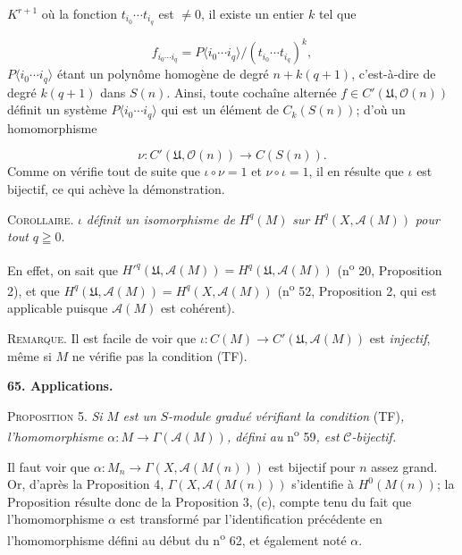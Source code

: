  $K^{r+1}$ où la fonction $t_{i_0} \cdots t_{i_q}$ est $\neq 0$, il existe un entier $k$ tel que

\begin{equation*}
f_{i_0 \cdots i_q} = P\langle i_0 \cdots i_q\rangle/(t_{i_0} \cdots t_{i_q})^k,
\end{equation*}
$P\langle i_0 \cdots i_q\rangle$ étant un polynôme homogène de degré $n + k(q + 1)$, c'est-à-dire de degré $k(q + 1)$ dans $S(n)$. Ainsi, toute cochaîne alternée $f \in C'(\mathfrak{U}, \mathcal{O}(n))$ définit un système $P\langle i_0 \cdots i_q\rangle$ qui est un élément de $C_k(S(n))$; d'où un homomorphisme

\begin{equation*}
\nu : C'(\mathfrak{U}, \mathcal{O}(n)) \to C(S(n)).
\end{equation*}
Comme on vérifie tout de suite que $\iota \circ \nu = 1$ et $\nu \circ \iota = 1$, il en résulte que $\iota$ est bijectif, ce qui achève la démonstration.

\textsc{Corollaire}. $\iota$ \textit{définit un isomorphisme de} $H^q(M)$ \textit{sur} $H^q(X, \mathcal{A}(M))$ \textit{pour tout} $q \geqq 0$.

En effet, on sait que $H'^q(\mathfrak{U}, \mathcal{A}(M)) = H^q(\mathfrak{U}, \mathcal{A}(M))$ (n\textsuperscript{o} 20, Proposition 2), et que $H^q(\mathfrak{U}, \mathcal{A}(M)) = H^q(X, \mathcal{A}(M))$ (n\textsuperscript{o} 52, Proposition 2, qui est applicable puisque $\mathcal{A}(M)$ est cohérent).

\textsc{Remarque}. Il est facile de voir que $\iota : C(M) \to C'(\mathfrak{U}, \mathcal{A}(M))$ est \textit{injectif}, même si $M$ ne vérifie pas la condition (TF).


\textbf{65. Applications.}

\textsc{Proposition} 5. \textit{Si} $M$ \textit{est un} $S$\textit{-module gradué vérifiant la condition} (TF)\textit{, l'homomorphisme} $\alpha : M \to \Gamma(\mathcal{A}(M))$\textit{, défini au} n\textsuperscript{o} 59\textit{, est} $\mathcal{C}$\textit{-bijectif.}

Il faut voir que $\alpha : M_n \to \Gamma(X, \mathcal{A}(M(n)))$ est bijectif pour $n$ assez grand. Or, d'après la Proposition 4, $\Gamma(X, \mathcal{A}(M(n)))$ s'identifie à $H^0(M(n))$; la Proposition résulte donc de la Proposition 3, (c), compte tenu du fait que l'homomorphisme $\alpha$ est transformé par l'identification précédente en l'homomorphisme défini au début du n\textsuperscript{o} 62, et également noté $\alpha$.

